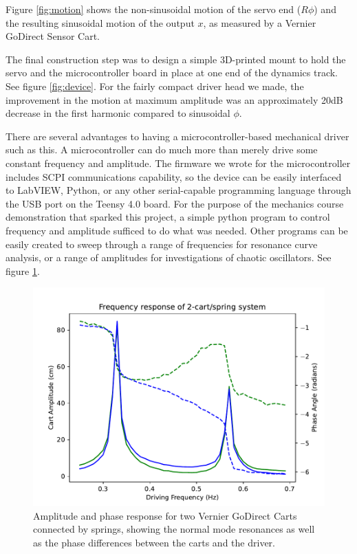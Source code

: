 \documentclass[prb,preprint]{revtex4-1}
\begin{document}
Figure \ref{fig:motion} shows the non-sinusoidal motion of the servo end ($R\phi$) and the resulting sinusoidal motion of the output $x$, as measured by a Vernier GoDirect Sensor Cart.\cite{VernierCart}

The final construction step was to design a simple 3D-printed mount to hold the servo and the microcontroller board in place at one end of the dynamics track. 
See figure \ref{fig:device}.
For the fairly compact driver head we made, the improvement in the motion at maximum amplitude was an approximately 20dB decrease in the first harmonic compared to sinusoidal $\phi$.

There are several advantages to having a microcontroller-based mechanical driver such as this. 
A microcontroller can do much more than merely drive some constant frequency and amplitude. 
The firmware we wrote for the microcontroller includes SCPI communications capability, so the device can be easily interfaced to LabVIEW, Python, or any other serial-capable programming language through the USB port on the Teensy 4.0 board.
For the purpose of the mechanics course demonstration that sparked this project, a simple python program to control frequency and amplitude sufficed to do what was needed. Other programs can be easily created to sweep through a range of frequencies for resonance curve analysis, or a range of amplitudes for investigations of chaotic oscillators. 
See figure \ref{fig:2-carts}.

\begin{figure}[h]
	\begin{center}
		\includegraphics{2-cart_response}
	\end{center}
	\caption{Amplitude and phase response for two Vernier GoDirect Carts connected by springs, showing the normal mode resonances as well as the phase differences between the carts and the driver.}
	\label{fig:2-carts}
\end{figure}
\end{document}
